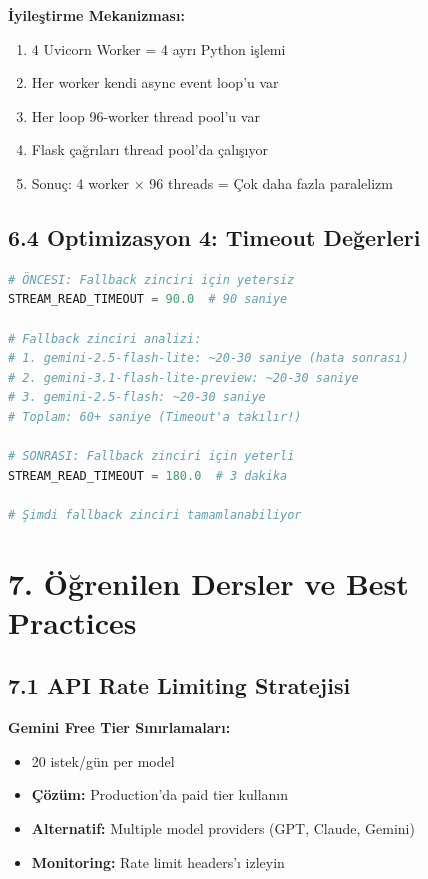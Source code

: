 \documentclass[12pt,a4paper]{report}
\begin{document}
\textbf{İyileştirme Mekanizması:}
\begin{enumerate}
    \item 4 Uvicorn Worker = 4 ayrı Python işlemi
    \item Her worker kendi async event loop'u var
    \item Her loop 96-worker thread pool'u var
    \item Flask çağrıları thread pool'da çalışıyor
    \item Sonuç: 4 worker × 96 threads = Çok daha fazla paralelizm
\end{enumerate}

\subsection{6.4 Optimizasyon 4: Timeout Değerleri}

\begin{lstlisting}[language=Python]
# ÖNCESI: Fallback zinciri için yetersiz
STREAM_READ_TIMEOUT = 90.0  # 90 saniye

# Fallback zinciri analizi:
# 1. gemini-2.5-flash-lite: ~20-30 saniye (hata sonrası)
# 2. gemini-3.1-flash-lite-preview: ~20-30 saniye
# 3. gemini-2.5-flash: ~20-30 saniye
# Toplam: 60+ saniye (Timeout'a takılır!)

# SONRASI: Fallback zinciri için yeterli
STREAM_READ_TIMEOUT = 180.0  # 3 dakika

# Şimdi fallback zinciri tamamlanabiliyor
\end{lstlisting}

\newpage

\section{7. Öğrenilen Dersler ve Best Practices}

\subsection{7.1 API Rate Limiting Stratejisi}

\textbf{Gemini Free Tier Sınırlamaları:}
\begin{itemize}
    \item 20 istek/gün per model
    \item \textbf{Çözüm:} Production'da paid tier kullanın
    \item \textbf{Alternatif:} Multiple model providers (GPT, Claude, Gemini)
    \item \textbf{Monitoring:} Rate limit headers'ı izleyin
\end{itemize}
\end{document}
